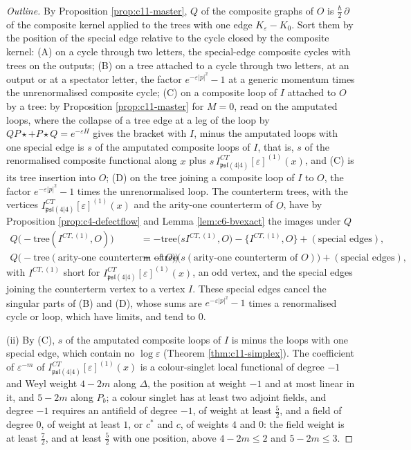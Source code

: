 \begin{proof}[Outline]
By Proposition \ref{prop:c11-master}, $Q$ of the composite graphs of $O$ is $\tfrac\hbar2\,\partial$ of the composite kernel applied to the trees with one edge $K_\varepsilon-K_0$. Sort them by the position of the special edge relative to the cycle closed by the composite kernel: (A) on a cycle through two letters, the special-edge composite cycles with trees on the outputs; (B) on a tree attached to a cycle through two letters, at an output or at a spectator letter, the factor $e^{-\varepsilon|p|^2}-1$ at a generic momentum times the unrenormalised composite cycle; (C) on a composite loop of $I$ attached to $O$ by a tree: by Proposition \ref{prop:c11-master} for $M=0$, read on the amputated loops, where the collapse of a tree edge at a leg of the loop by $QP\star+P\star Q=e^{-\varepsilon H}$ gives the bracket with $I$, minus the amputated loops with one special edge is $s$ of the amputated composite loops of $I$, that is, $s$ of the renormalised composite functional along $x$ plus $s\,I^{CT}_{\mathfrak{psl}(4|4)}[\varepsilon]^{(1)}(x)$, and (C) is its tree insertion into $O$; (D) on the tree joining a composite loop of $I$ to $O$, the factor $e^{-\varepsilon|p|^2}-1$ times the unrenormalised loop. The counterterm trees, with the vertices $I^{CT}_{\mathfrak{psl}(4|4)}[\varepsilon]^{(1)}(x)$ and the arity-one counterterm of $O$, have by Proposition \ref{prop:c4-defectflow} and Lemma \ref{lem:c6-bvexact} the images under $Q$
\[
\begin{aligned}
Q\big(-\text{tree}(I^{CT,(1)},O)\big)&=-\text{tree}\big(sI^{CT,(1)},O\big)-\{I^{CT,(1)},O\}+(\text{special edges}),\\
Q\big(-\text{tree}(\text{arity-one counterterm of }O)\big)&=-\text{tree}\big(s(\text{arity-one counterterm of }O)\big)+(\text{special edges}),
\end{aligned}
\]
with $I^{CT,(1)}$ short for $I^{CT}_{\mathfrak{psl}(4|4)}[\varepsilon]^{(1)}(x)$, an odd vertex, and the special edges joining the counterterm vertex to a vertex $I$. These special edges cancel the singular parts of (B) and (D), whose sums are $e^{-\varepsilon|p|^2}-1$ times a renormalised cycle or loop, which have limits, and tend to $0$.

(ii) By (C), $s$ of the amputated composite loops of $I$ is minus the loops with one special edge, which contain no $\log\varepsilon$ (Theorem \ref{thm:c11-simplex}). The coefficient of $\varepsilon^{-m}$ of $I^{CT}_{\mathfrak{psl}(4|4)}[\varepsilon]^{(1)}(x)$ is a colour-singlet local functional of degree $-1$ and Weyl weight $4-2m$ along $\Delta$, the position at weight $-1$ and at most linear in it, and $5-2m$ along $P_b$; a colour singlet has at least two adjoint fields, and degree $-1$ requires an antifield of degree $-1$, of weight at least $\tfrac52$, and a field of degree $0$, of weight at least $1$, or $c^*$ and $c$, of weights $4$ and $0$: the field weight is at least $\tfrac72$, and at least $\tfrac52$ with one position, above $4-2m\le2$ and $5-2m\le3$.


\end{proof}
